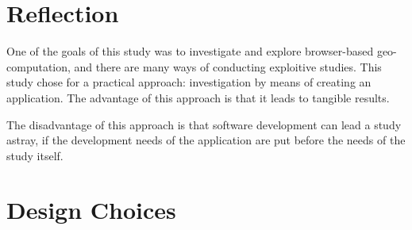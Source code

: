 \section{Reflection}

One of the goals of this study was to investigate and explore browser-based geo-computation, and there are many ways of conducting exploitive studies. 
This study chose for a practical approach: investigation by means of creating an application.
The advantage of this approach is that it leads to tangible results. 

The disadvantage of this approach is that software development can lead a study astray, if the development needs of the application are put before the needs of the study itself.












\section{ Design Choices }






